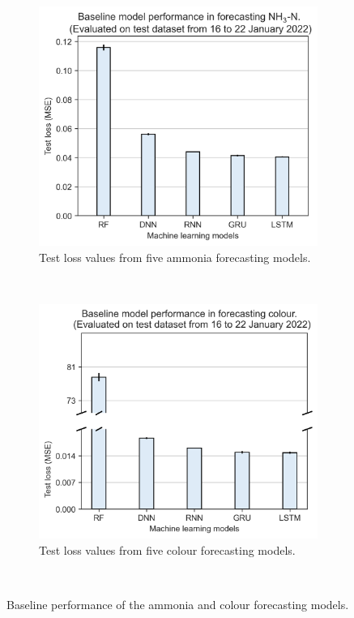 \begin{figure}[!ht]
  \centering
  \begin{subfigure}[t]{0.75\textwidth}
    \includegraphics[width=\linewidth]{imgs/results/baseline-models-nh3.png}
    \caption{Test loss values from five ammonia forecasting models.} \label{fig:baseline-nh3}
  \end{subfigure}\\
  \vspace{2em}%
  \begin{subfigure}[t]{0.75\textwidth}
    \includegraphics[width=\linewidth]{imgs/results/baseline-models-colour.png}
    \caption{Test loss values from five colour forecasting models.} \label{fig:baseline-colour}
  \end{subfigure}\\
\caption{Baseline performance of the ammonia and colour forecasting models.} \label{fig:baseline-performance}
\end{figure}

